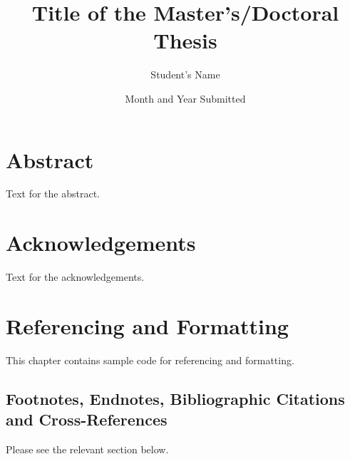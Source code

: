 \documentclass[12pt]{MUNThesisBibTeX}
\title{Title of the Master's/Doctoral Thesis}
\author{Student's Name}
\date{Month and Year Submitted}
\begin{document}
\muntitlepage

\setcounter{secnumdepth}{3} \setcounter{tocdepth}{3}

 \setcounter{page}{1}

\doublespacing
\setlength{\topmargin}{-.5in}

\chapter*{Abstract}
Text for the abstract.

\chapter*{Acknowledgements}
Text for the acknowledgements.

\renewcommand{\contentsname}{Table of Contents}
\tableofcontents{}
\listoftables{}
\listoffigures{}

\doublespacing
\clearpage



\chapter{Referencing and Formatting}
\setcounter{secnumdepth}{3} 
\setcounter{page}{1} \pagestyle{myheadings}
\markboth{}{}\markright{} \rhead{\thepage} \setcounter{page}{1}
\pagestyle{myheadings}  \rhead{\thepage}
\setcounter{page}{1}

This chapter contains sample code for referencing and formatting.

\section{Footnotes, Endnotes, Bibliographic Citations and Cross-References}
Please see the relevant section below.
\end{document}
